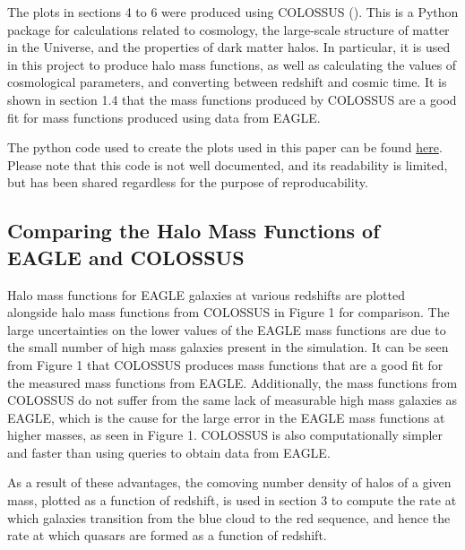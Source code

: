 \documentclass[12pt]{article}%
\begin{document}
The plots in sections 4 to 6 were produced using COLOSSUS (\cite{COLOSSUS}). This is a Python package for calculations related to cosmology, the large-scale structure of matter in the Universe, and the properties of dark matter halos. In particular, it is used in this project to produce halo mass functions, as well as calculating the values of cosmological parameters, and converting between redshift and cosmic time. It is shown in section 1.4 that the mass functions produced by COLOSSUS are a good fit for mass functions produced using data from EAGLE.\par

The python code used to create the plots used in this paper can be found \href{https://github.com/xvh422/L4-Project/blob/main/J_Carter_Code.ipynb}{here}. Please note that this code is not well documented, and its readability is limited, but has been shared regardless for the purpose of reproducability.

\subsection{Comparing the Halo Mass Functions of EAGLE and COLOSSUS}

Halo mass functions for EAGLE galaxies at various redshifts are plotted alongside halo mass functions from COLOSSUS in Figure 1 for comparison. The large uncertainties on the lower values of the EAGLE mass functions are due to the small number of high mass galaxies present in the simulation. It can be seen from Figure 1 that COLOSSUS produces mass functions that are a good fit for the measured mass functions from EAGLE. Additionally, the mass functions from COLOSSUS do not suffer from the same lack of measurable high mass galaxies as EAGLE, which is the cause for the large error in the EAGLE mass functions at higher masses, as seen in Figure 1. COLOSSUS is also computationally simpler and faster than using queries to obtain data from EAGLE.\par

As a result of these advantages, the comoving number density of halos of a given mass, plotted as a function of redshift, is used in section 3 to compute the rate at which galaxies transition from the blue cloud to the red sequence, and hence the rate at which quasars are formed as a function of redshift.
\end{document}
